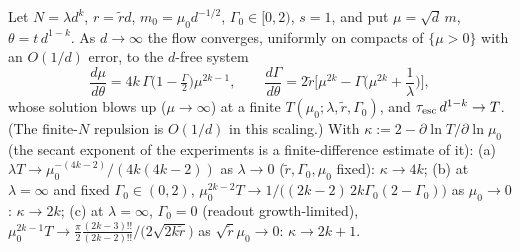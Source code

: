 \begin{proposition}\label{prop:joint}
Let $N=\lambda d^k$, $r=\tilde r d$, $m_0=\mu_0d^{-1/2}$, $\Gamma_0\in[0,2)$, $s=1$, and put $\mu=\sqrt d\,m$, $\theta=t\,d^{1-k}$. As $d\to\infty$ the flow
converges, uniformly on compacts of $\{\mu>0\}$ with an $O(1/d)$ error, to the $d$-free system
\begin{equation}\label{eq:limit}
\frac{d\mu}{d\theta}=4k\,\Gamma\big(1-\tfrac\Gamma2\big)\mu^{2k-1},\qquad \frac{d\Gamma}{d\theta}=2\tilde r\Big[\mu^{2k}-\Gamma\Big(\mu^{2k}+\frac1\lambda\Big)\Big],
\end{equation}
whose solution blows up ($\mu\to\infty$) at a finite $T(\mu_0;\lambda,\tilde r,\Gamma_0)$, and $\tau_{\rm esc}\,d^{1-k}\to T$. (The finite-$N$ repulsion is
$O(1/d)$ in this scaling.) With $\kappa:=2-\partial\ln T/\partial\ln\mu_0$ (the secant exponent of the experiments is a finite-difference estimate of it):
(a) $\lambda T\to\mu_0^{-(4k-2)}/(4k(4k-2))$ as $\lambda\to0$ ($\tilde r,\Gamma_0,\mu_0$ fixed): $\kappa\to4k$;
(b) at $\lambda=\infty$ and fixed $\Gamma_0\in(0,2)$, $\mu_0^{2k-2}T\to1/\big((2k-2)\,2k\Gamma_0(2-\Gamma_0)\big)$ as $\mu_0\to0$: $\kappa\to2k$;
(c) at $\lambda=\infty$, $\Gamma_0=0$ (readout growth-limited), $\mu_0^{2k-1}T\to\frac{\pi}{2}\frac{(2k-3)!!}{(2k-2)!!}\big/\big(2\sqrt{2k\tilde r}\big)$ as $\sqrt{\tilde r}\mu_0\to0$: $\kappa\to2k+1$.
\end{proposition}
